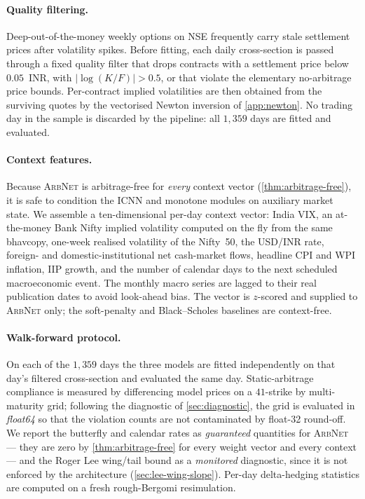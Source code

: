 \documentclass[largeformat]{interact}
\theoremstyle{plain}
\theoremstyle{definition}
\newcommand{\arbnet}{\textsc{ArbNet}}
\newcommand{\bs}{Black--Scholes}
\begin{document}
\paragraph{Quality filtering.}
Deep-out-of-the-money weekly options on NSE frequently carry stale settlement prices after volatility spikes. Before fitting, each daily cross-section is passed through a fixed quality filter that drops contracts with a settlement price below $0.05$~INR, with $|\log(K/F)| > 0.5$, or that violate the elementary no-arbitrage price bounds. Per-contract implied volatilities are then obtained from the surviving quotes by the vectorised Newton inversion of \cref{app:newton}. No trading day in the sample is discarded by the pipeline: all $1{,}359$ days are fitted and evaluated.

\paragraph{Context features.}
Because \arbnet{} is arbitrage-free for \emph{every} context vector (\cref{thm:arbitrage-free}), it is safe to condition the ICNN and monotone modules on auxiliary market state. We assemble a ten-dimensional per-day context vector: India VIX, an at-the-money Bank Nifty implied volatility computed on the fly from the same bhavcopy, one-week realised volatility of the Nifty~50, the USD/INR rate, foreign- and domestic-institutional net cash-market flows, headline CPI and WPI inflation, IIP growth, and the number of calendar days to the next scheduled macroeconomic event. The monthly macro series are lagged to their real publication dates to avoid look-ahead bias. The vector is $z$-scored and supplied to \arbnet{} only; the soft-penalty and \bs{} baselines are context-free.

\paragraph{Walk-forward protocol.}
On each of the $1{,}359$ days the three models are fitted independently on that day's filtered cross-section and evaluated the same day. Static-arbitrage compliance is measured by differencing model prices on a $41$-strike by multi-maturity grid; following the diagnostic of \cref{sec:diagnostic}, the grid is evaluated in \emph{float64} so that the violation counts are not contaminated by float-32 round-off. We report the butterfly and calendar rates as \emph{guaranteed} quantities for \arbnet{} --- they are zero by \cref{thm:arbitrage-free} for every weight vector and every context --- and the Roger Lee wing/tail bound as a \emph{monitored} diagnostic, since it is not enforced by the architecture (\cref{sec:lee-wing-slope}). Per-day delta-hedging statistics are computed on a fresh rough-Bergomi resimulation.
\end{document}
